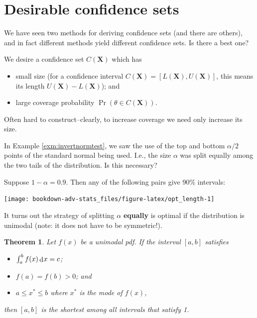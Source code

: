 \documentclass[
]{book}
\providecommand{\tightlist}{%
  \setlength{\itemsep}{0pt}\setlength{\parskip}{0pt}}
\newcommand{\bX}{{\boldsymbol X}}
\DeclareMathOperator{\dd}{d}
\newcommand{\dint}{\dd\hspace{0.5pt}\!}
\newtheorem{theorem}{Theorem}[chapter]
\theoremstyle{definition}
\theoremstyle{definition}
\theoremstyle{definition}
\theoremstyle{definition}
\theoremstyle{remark}
\begin{document}
\hypertarget{desirable-confidence-sets}{%
\section{Desirable confidence sets}\label{desirable-confidence-sets}}

We have seen two methods for deriving confidence sets (and there are others), and in fact different methods yield different confidence sets.
Is there a best one?

We desire a confidence set \(C(\bX)\) which has

\begin{itemize}
\item
  small size (for a confidence interval \(C(\bX)=[L(\bX), U(\bX)]\), this means its length \(U(\bX)-L(\bX)\)); and
\item
  large coverage probability \(\Pr(\theta \in C(\bX))\).
\end{itemize}

Often hard to construct--clearly, to increase coverage we need only increase its size.

In Example \ref{exm:invertnormtest}, we saw the use of the top and bottom \(\alpha/2\) points of the standard normal being used. I.e., the size \(\alpha\) was split equally among the two tails of the distribution. Is this necessary?

Suppose \(1-\alpha =0.9\). Then any of the following pairs give 90\% intervals:

\begin{center}\texttt{[image: bookdown-adv-stats\_files/figure-latex/opt\_length-1]} \end{center}

It turns out the strategy of splitting \(\alpha\) \textbf{equally} is optimal if the distribution is unimodal (note: it does not have to be symmetric!).

\begin{theorem}
Let \(f(x)\) be a unimodal pdf. If the interval \([a,b]\) satisfies

\begin{itemize}
\tightlist
\item
  \(\int_a^b f(x) \dint x = c\);
\item
  \(f(a)=f(b)>0\); and
\item
  \(a \leq x^* \leq b\) where \(x^*\) is the mode of \(f(x)\),
\end{itemize}

then \([a,b]\) is the shortest among all intervals that satisfy 1.
\end{theorem}
\end{document}
